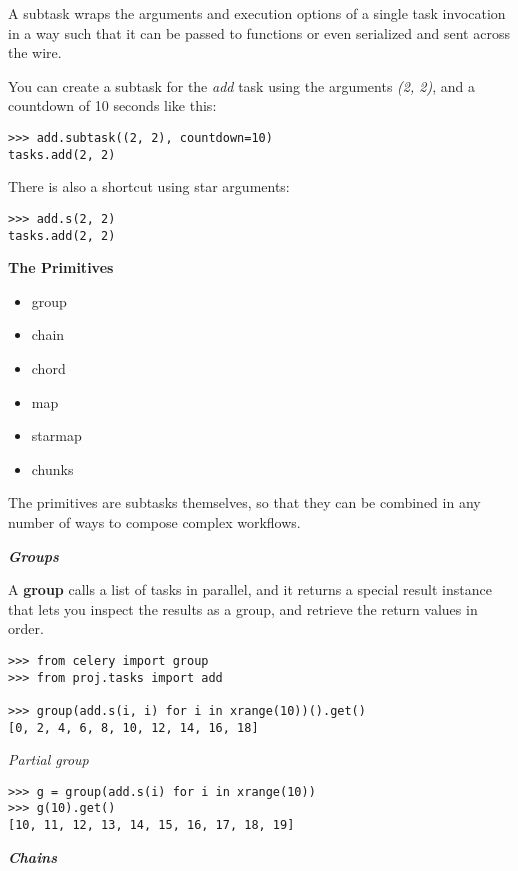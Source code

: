 \documentclass[9pt,a4paper]{article}
\begin{document}
\begin{CJK*}{GBK}{kai}
A subtask wraps the arguments and execution options of a single task invocation in a way such that it can be passed to functions or even serialized and sent across the wire.

You can create a subtask for the \textit{add} task using the arguments \textit{(2, 2)}, and a countdown of 10 seconds like this:

\begin{Verbatim}[frame=single]
>>> add.subtask((2, 2), countdown=10)
tasks.add(2, 2)
\end{Verbatim}

There is also a shortcut using star arguments:

\begin{Verbatim}[frame=single]
>>> add.s(2, 2)
tasks.add(2, 2)
\end{Verbatim}

\textbf{The Primitives}

\begin{itemize}
\item group
\item chain
\item chord
\item map
\item starmap
\item chunks
\end{itemize}

The primitives are subtasks themselves, so that they can be combined in any number of ways to compose complex workflows.

\textit{\textbf{Groups}}

A \textbf{group} calls a list of tasks in parallel, and it returns a special result instance that lets you inspect the results as a group, and retrieve the return values in order.

\begin{Verbatim}[frame=single]
>>> from celery import group
>>> from proj.tasks import add

>>> group(add.s(i, i) for i in xrange(10))().get()
[0, 2, 4, 6, 8, 10, 12, 14, 16, 18]
\end{Verbatim}

\textit{Partial group}

\begin{Verbatim}[frame=single]
>>> g = group(add.s(i) for i in xrange(10))
>>> g(10).get()
[10, 11, 12, 13, 14, 15, 16, 17, 18, 19]
\end{Verbatim}

\textit{\textbf{Chains}}


\end{CJK*}
\end{document}
